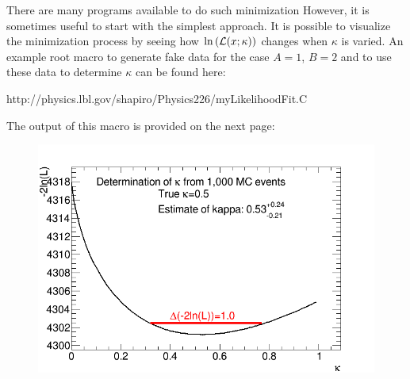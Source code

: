 \documentclass[12pt]{article}
\begin{document}
There are many programs available to do such minimization  However, it is sometimes useful to
start with the simplest approach.  It is possible to visualize the minimization process
by seeing how $\ln \left ( {\cal L}(x;\kappa)\right )$ changes when $\kappa$ is varied.  An example
root macro to generate fake data for the case $A=1$, $B=2$ and to use these data to determine
$\kappa$ can be found here:
\begin{flushleft}
http://physics.lbl.gov/shapiro/Physics226/myLikelihoodFit.C
\end{flushleft}
The output of this macro is provided on the next page:
\begin{figure}
\begin{center}
  \includegraphics[width=8.0in]{lnLikelikhood.png}
\end{center}
\end{figure}
\end{document}
